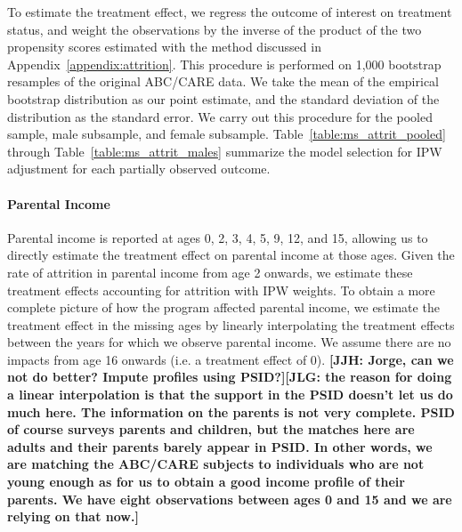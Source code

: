 \noindent To estimate the treatment effect, we regress the outcome of interest on treatment status, and weight the
observations by the inverse of the product of the two propensity scores estimated with the method discussed in Appendix~\ref{appendix:attrition}. This procedure is performed on 1,000 bootstrap resamples of the original ABC/CARE data.
We take the mean of the empirical bootstrap distribution as our point estimate, and the standard deviation
of the distribution as the standard error. We carry out this procedure for the
pooled sample, male subsample, and female subsample. Table~\ref{table:ms_attrit_pooled} through Table~\ref{table:ms_attrit_males} summarize the model selection for IPW adjustment for each partially observed outcome. \\

\paragraph{Parental Income}

\noindent Parental income is reported at ages 0, 2, 3, 4, 5, 9, 12, and 15, allowing us to directly estimate
the treatment effect on parental income at those ages. Given the rate of attrition in
parental income from age 2 onwards, we estimate these treatment effects accounting for attrition
with IPW weights.
To obtain a more complete picture of how the
program affected parental income, we estimate the treatment effect in the missing ages by linearly
interpolating the treatment effects between the years for which we observe parental income. We assume
there are no impacts from age 16 onwards (i.e. a treatment effect of 0). \textbf{[JJH: Jorge, can we not do better? Impute profiles using PSID?]}\textbf{[JLG: the reason for doing a linear interpolation is that the support in the PSID doesn't let us do much here. The information on the parents is not very complete. PSID of course surveys parents and children, but the matches here are adults and their parents barely appear in PSID. In other words, we are matching the ABC/CARE subjects to individuals who are not young enough as for us to obtain a good income profile of their parents.  We have eight observations between ages 0 and 15 and we are relying on that now.]} \\

